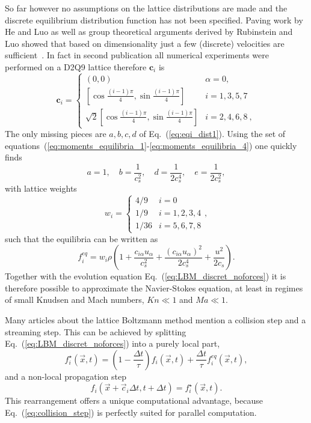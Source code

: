 So far however no assumptions on the lattice distributions are made and the discrete equilibrium distribution function has not been specified.
Paving work by He and Luo as well as group theoretical arguments derived by Rubinstein and Luo showed that based on dimensionality just a few (discrete) velocities are sufficient~\cite{heTheoryLatticeBoltzmann1997, rubinsteinTheoryLatticeBoltzmann2008}.
In fact in second publication all numerical experiments were performed on a D2Q9 lattice therefore $\mathbf{c}_{i}$ is
\begin{equation}\label{eq:speeds_method}
\mathbf{c}_{i}  =
\left\{
\begin{array}{ll}
(0,0) & \alpha = 0, \\
\left[\cos{\frac{(i-1)\pi}{4}}, \sin{\frac{(i-1)\pi}{4}} \right] &  i=1,3,5,7 \\
\sqrt{2}\left[\cos{\frac{(i-1)\pi}{4}}, \sin{\frac{(i-1)\pi}{4}} \right] & i=2,4,6,8~,
\end{array}
\right.    
\end{equation}
The only missing pieces are $a, b, c, d$ of Eq.~(\ref{eq:eqi_dist1}).
Using the set of equations~(\ref{eq:moments_equilibria_1}-\ref{eq:moments_equilibria_4}) one quickly finds
\begin{equation}
    a = 1,\quad b = \frac{1}{c_s^2},\quad d = \frac{1}{2c_s^4},\quad e = \frac{1}{2c_s^2},
\end{equation}
with lattice weights
\begin{equation}\label{eq:weightsD2Q9_meth}
w_{i} = \begin{cases}
4/9 &\text{$i = 0$}\\
1/9 &\text{$i = 1,2,3,4$}\\
1/36 &\text{$i = 5,6,7,8$}
\end{cases}
,
\end{equation}
such that the equilibria can be written as
\begin{equation}\label{eq:eqi_dist2}
    f_{i}^{eq} = w_{i}\rho\left(1 + \frac{c_{i\alpha} u_{\alpha}}{c_s^2} +  \frac{(c_{i\alpha} u_{\alpha})^2}{2c_s^4} + \frac{u^2}{2c_s}\right).
\end{equation}
Together with the evolution equation Eq.~(\ref{eq:LBM_discret_noforces}) it is therefore possible to approximate the Navier-Stokes equation, at least in regimes of small Knudsen and Mach numbers, $Kn \ll 1$ and $Ma \ll 1$.

Many articles about the lattice Boltzmann method mention a collision step and a streaming step.
This can be achieved by splitting Eq.~(\ref{eq:LBM_discret_noforces}) into a purely local part, 
\begin{equation}\label{eq:collision_step}
    f^{\star}_i(\vec{x},t) = \left(1-\frac{\Delta t}{\tau}\right)f_i(\vec{x},t) + \frac{\Delta t}{\tau}f_i^{eq}(\vec{x},t),
\end{equation}
and a non-local propagation step
\begin{equation}\label{eq:steaming_step}
    f_i(\vec{x}+\vec{c}_i\Delta t,t + \Delta t) = f^{\star}_i(\vec{x},t).
\end{equation}
This rearrangement offers a unique computational advantage, because Eq.~(\ref{eq:collision_step}) is perfectly suited for parallel computation.

